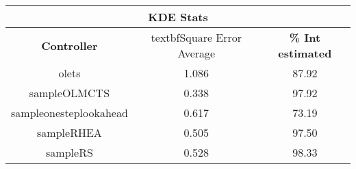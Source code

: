 \begin{table}[h!]
\begin{center}
\begin{adjustbox}{width=0.5\textwidth}
\begin{tabular}{|c|c|c|}
\hline
\multicolumn{3}{|c|}{\textbf{KDE Stats}}\\
\hline\hline
\textbf{Controller} & textbf{Square Error Average} & \textbf{\% Int estimated}\\
\hline
\hline
olets & 1.086 & 87.92
 \\
\hline
sampleOLMCTS & 0.338 & 97.92
 \\
\hline
sampleonesteplookahead & 0.617 & 73.19
 \\
\hline
sampleRHEA & 0.505 & 97.50
 \\
\hline
sampleRS & 0.528 & 98.33
 \\
\hline
\end{tabular}
\end{adjustbox}
\caption{}
\label{table:stats_KEH}
\end{center}
\end{table}
